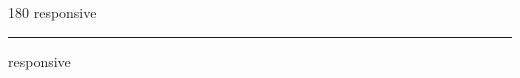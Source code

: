 
\begin{frame}
\begin{center}
\begin{turn}{180}
{\fontsize{2.5cm}{1em}\selectfont responsive}
\end{turn}
\vspace{1em}\par  
\hrule
\vspace{1em}\par  
{\fontsize{2.5cm}{1em}\selectfont responsive}
\end{center}
\end{frame}
